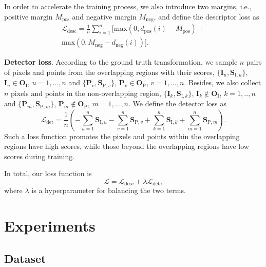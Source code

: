 \documentclass[lettersize,journal]{IEEEtran}
\begin{document}
In order to accelerate the training process, we also introduce two margins, i.e., positive margin $M_\text{pos}$ and negative margin $M_\text{neg}$, and define the descriptor loss as 
\begin{equation}
\begin{split}
\mathcal{L}_{\text{desc}}=\frac{1}{n}\sum^{n}_{i=1}[\text{max}(0,d_{\text{pos}}(i)-M_{\text{pos}})+ \\ \text{max}(0,M_{\text{neg}}-d_{\text{neg}}(i))].
\end{split}
\end{equation}

\noindent\textbf{Detector loss}. 
According to the ground truth transformation, we sample $n$ pairs of pixels and points from the overlapping regions with their scores, $\{\mathbf{I}_u,\mathbf{S}_{\text{I},u}\}$, $\mathbf{I}_u\in \mathbf{O}_{\text{I}}$, $u=1,...,n$ and $\{\mathbf{P}_v,\mathbf{S}_{\text{P},v}\}$, $\mathbf{P}_v\in \mathbf{O}_{\text{P}}$, $v=1,...,n$. Besides, we also collect $n$ pixels and points in the non-overlapping region, $\{\mathbf{I}_k,\mathbf{S}_{\text{I},k}\}$, $\mathbf{I}_k\notin \mathbf{O}_{\text{I}}$, $k=1,..,n$ and $\{\mathbf{P}_m,\mathbf{S}_{\text{P},m}\}$, $\mathbf{P}_m\notin \mathbf{O}_{\text{P}}$, $m=1,...,n$. We define the detector loss as
 \begin{equation}
\mathcal{L}_{\text{det}}=\frac{1}{n}\left(-\sum_{u=1}^{n}\mathbf{S}_{\text{I},u}-\sum_{v=1}^{n}\mathbf{S}_{\text{P},v}+\sum_{k=1}^{n}\mathbf{S}_{\text{I},k}+\sum_{m=1}^{n}\mathbf{S}_{\text{P},m}\right).
 \end{equation}
Such a loss function promotes the pixels and points within the overlapping regions have high scores, while those beyond the overlapping regions have low scores during training.

In total, our loss function is
 \begin{equation}
\mathcal{L}=\mathcal{L}_{\text{desc}}+\lambda \mathcal{L}_{\text{det}},
 \end{equation}
where $\lambda$ is a hyperparameter for balancing the two terms.

\section{Experiments}
\label{sec:exp}

\subsection{Dataset}
\end{document}
